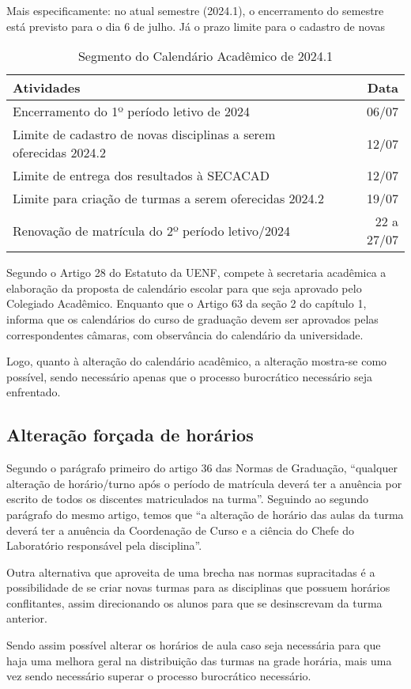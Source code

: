 Mais especificamente: no atual semestre (2024.1), o encerramento do semestre está previsto para o dia 6 de julho. Já o prazo limite para o cadastro de novas

\begin{table}
  \centering
  \caption{Segmento do Calendário Acadêmico de 2024.1}
  \label{tab:calendario}
  \begin{tabular}{| l r |}
    \hline
    \textbf{Atividades}                                               & \textbf{Data} \\
    \hline
    Encerramento do 1º período letivo de 2024                         & 06/07         \\
    Limite de cadastro de novas disciplinas a serem oferecidas 2024.2 & 12/07         \\
    Limite de entrega dos resultados à SECACAD                        & 12/07         \\
    Limite para criação de turmas a serem oferecidas 2024.2           & 19/07         \\
    Renovação de matrícula do 2º período letivo/2024                  & 22 a 27/07    \\
    \hline
  \end{tabular}
\end{table}


Segundo o Artigo 28 do Estatuto da UENF, compete à secretaria acadêmica a elaboração da proposta de calendário escolar para que seja aprovado pelo Colegiado Acadêmico. Enquanto que o Artigo 63 da seção 2 do capítulo 1, informa que os calendários do curso de graduação devem ser aprovados pelas correspondentes câmaras, com observância do calendário da universidade.

Logo, quanto à alteração do calendário acadêmico, a alteração mostra-se como possível, sendo necessário apenas que o processo burocrático necessário seja enfrentado.

\subsection{Alteração forçada de horários} %

Segundo o parágrafo primeiro do artigo 36 das Normas de Graduação, ``qualquer alteração de horário/turno após o período de matrícula deverá ter a anuência por escrito de todos os discentes matriculados na turma''. Seguindo ao segundo parágrafo do mesmo artigo, temos que ``a alteração de horário das aulas da turma deverá ter a anuência da Coordenação de Curso e a ciência do Chefe do Laboratório responsável pela disciplina''.

Outra alternativa que aproveita de uma brecha nas normas supracitadas é a possibilidade de se criar novas turmas para as disciplinas que possuem horários conflitantes, assim direcionando os alunos para que se desinscrevam da turma anterior.

Sendo assim possível alterar os horários de aula caso seja necessária para que haja uma melhora geral na distribuição das turmas na grade horária, mais uma vez sendo necessário superar o processo burocrático necessário.
